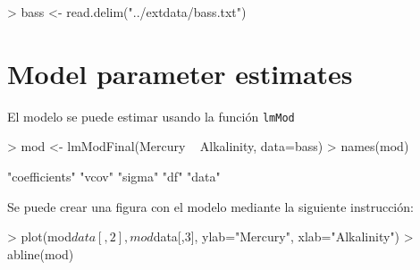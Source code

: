 \documentclass[11pt]{article}
\begin{document}
\begin{Schunk}
\begin{Sinput}
> bass <- read.delim("../extdata/bass.txt")
\end{Sinput}
\end{Schunk}

\section{Model parameter estimates}

\noindent El modelo se puede estimar usando la funci\'on {\tt lmMod}

\begin{Schunk}
\begin{Sinput}
> mod <- lmModFinal(Mercury ~ Alkalinity, data=bass)
> names(mod)
\end{Sinput}
\begin{Soutput}
[1] "coefficients" "vcov"         "sigma"        "df"           "data"        
\end{Soutput}
\end{Schunk}


\noindent Se puede crear una figura con el modelo mediante la siguiente instrucci\'on:

\begin{Schunk}
\begin{Sinput}
> plot(mod$data[,2], mod$data[,3], ylab="Mercury", xlab="Alkalinity")
> abline(mod)
\end{Sinput}
\end{Schunk}
\end{document}
